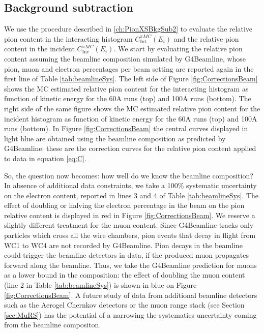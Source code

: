 \subsection{Background subtraction}\label{ch:BKGsubXSPuppa}
We use the procedure described in \ref{ch:PionXSBkgSub2} to evaluate the relative pion content in the interacting histogram $C^{\pi MC}_{\text{Int}} (E_{i})$  and the relative pion content in the incident $C^{\pi MC}_{\text{Inc}} (E_{i})$. We start by evaluating the relative pion content assuming the beamline composition simulated by G4Beamline, whose pion, muon and electron percentages per beam setting are reported again in the first line of Table \ref{tab:beamlineSys}. The left side of Figure \ref{fig:CorrectionsBeam} shows the  MC estimated  relative pion content for the interacting histogram as function of kinetic energy for the 60A runs (top) and 100A runs (bottom). The right side of the same figure shows the  MC estimated  relative pion content for the incident histogram as function of kinetic energy for the 60A runs (top) and 100A runs (bottom). In Figure \ref{fig:CorrectionsBeam} the central curves displayed in light blue are obtained using the beamline composition as predicted by G4Beamline: these are the correction curves for the relative pion content applied to data in equation \ref{eq:C}.

So, the question now becomes: how well do we know the beamline composition? In absence of additional data constraints,  we take a 100\% systematic uncertainty on the electron content, reported in lines 3 and 4 of Table \ref{tab:beamlineSys}. The effect of doubling or halving the electron percentage in the beam on the pion relative content is displayed in red in Figure \ref{fig:CorrectionsBeam}. We reserve a slightly different treatment for the muon content. Since G4Beamline tracks only particles which cross all the wire chambers, pion events that decay in flight from WC1 to WC4 are not recorded by G4Beamline. Pion decays in the beamline could  trigger the beamline detectors in data, if the produced muon propagates forward along the beamline. Thus, we take the G4Beamline prediction for muons as a lower bound in the composition: the effect of doubling the muon content (line 2 in Table \ref{tab:beamlineSys}) is shown in blue on Figure \ref{fig:CorrectionsBeam}. A future study of data from additional beamline detectors such as the Aerogel Chernkov detectors \cite{detectorPaper} or the muon range stack (see Section \ref{sec:MuRS}) has the potential of a narrowing the systematics uncertainty coming from the beamline compositon.


